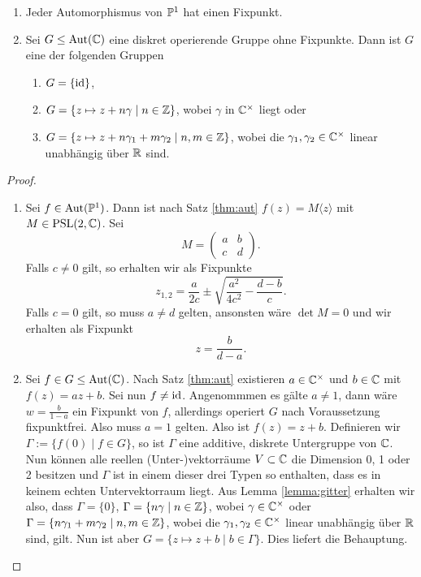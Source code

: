 \begin{lemma}
  \label{lemma:deck-pc}
  \begin{enumerate}
  \item Jeder Automorphismus von $\P^1$ hat einen Fixpunkt.
  \item Sei $G \leq \Aut(\C)$ eine diskret operierende Gruppe ohne
    Fixpunkte. Dann ist $G$ eine der folgenden Gruppen
    \begin{enumerate}
    \item $G = \{\id\}$,
    \item $G = \{ z \mapsto z + n \gamma \mid n \in \Z\}$, wobei
      $\gamma$ in $\C^\times$ liegt oder
    \item $G = \{z \mapsto z + n \gamma_1 + m \gamma_2 \mid n,m \in
      \Z\}$, wobei die $\gamma_1, \gamma_2 \in \C^\times$ linear
      unabhängig über $\R$ sind.
    \end{enumerate}
  \end{enumerate}
\end{lemma}

\begin{proof}
  \begin{enumerate}
  \item Sei $f \in \Aut(\P^1)$. Dann ist nach Satz \ref{thm:aut} $f(z) = M\langle z \rangle$ mit $M
    \in \PSL(2, \C)$. Sei
    \[
    M =
    \begin{pmatrix}
      a & b \\
      c & d
    \end{pmatrix}.
    \]
    Falls $c \neq 0$ gilt, so erhalten wir als Fixpunkte
    \[
    z_{1,2} = \frac{a}{2c} \pm \sqrt{\frac{a^2}{4 c^2} - \frac{d-b}{c}}.
    \]
    Falls $c = 0$ gilt, so muss $a \neq d$ gelten, ansonsten wäre
    $\det M = 0$ und wir erhalten als Fixpunkt
    \[
    z = \frac{b}{d-a}.
    \]
  \item Sei $f \in G \leq \Aut(\C)$. Nach Satz \ref{thm:aut}
    existieren $a \in \C^\times$ und $b \in \C$ mit \break$f(z) = az
    +b$. Sei nun $f \neq \id$. Angenommmen es gälte $a \neq 1$, dann
    wäre $w = \frac{b}{1-a}$ ein Fixpunkt von $f$, allerdings operiert
    $G$ nach Voraussetzung fixpunktfrei. Also muss $a = 1$
    gelten. Also ist $f(z) = z + b$. Definieren wir $\Gamma := \{f(0) \mid
    f \in G\}$, so ist $\Gamma$ eine additive, diskrete Untergruppe
    von $\C$. Nun können alle reellen (Unter-)vektorräume $V \subset
    \C$ die Dimension 0, 1 oder 2 besitzen und $\Gamma$ ist in einem
    dieser drei Typen so enthalten, dass es in keinem echten
    Untervektorraum liegt. Aus Lemma \ref{lemma:gitter} erhalten wir
    also, dass $\Gamma = \{0\}$, $\Gamma = \{ n \gamma \mid n \in \Z\}$,
    wobei $\gamma \in \C^\times$ oder\break $\Gamma = \{n \gamma_1 + m
    \gamma_2 \mid n,m \in \Z \}$, wobei die $\gamma_1, \gamma_2 \in
    \C^\times$ linear unabhängig über $\R$ sind, gilt. Nun ist aber
    $G = \{z \mapsto z + b \mid b \in \Gamma \}$.
    Dies liefert die Behauptung.
  \end{enumerate}
\end{proof}

